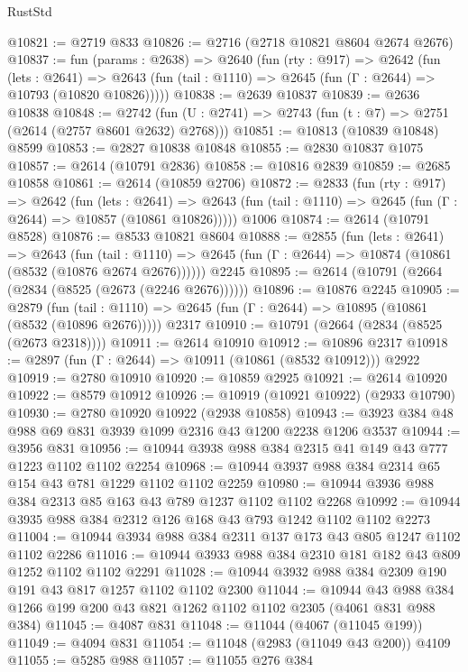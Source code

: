 \begin{lexlean}{RustStd}
\begin{coremodule}
@10821 := @2719 @833
@10826 := @2716 (@2718 @10821 @8604 @2674 @2676)
@10837 := fun (params : @2638) =>
  @2640
    (fun (rty : @917) =>
    @2642
      (fun (lets : @2641) =>
      @2643 (fun (tail : @1110) => @2645 (fun (Γ : @2644) => @10793 (@10820 @10826)))))
@10838 := @2639 @10837
@10839 := @2636 @10838
@10848 := @2742 (fun (U : @2741) => @2743 (fun (t : @7) => @2751 (@2614 (@2757 @8601 @2632) @2768)))
@10851 := @10813 (@10839 @10848) @8599
@10853 := @2827 @10838 @10848
@10855 := @2830 @10837 @1075
@10857 := @2614 (@10791 @2836)
@10858 := @10816 @2839
@10859 := @2685 @10858
@10861 := @2614 (@10859 @2706)
@10872 := @2833
    (fun (rty : @917) =>
    @2642
      (fun (lets : @2641) =>
      @2643 (fun (tail : @1110) => @2645 (fun (Γ : @2644) => @10857 (@10861 @10826)))))
    @1006
@10874 := @2614 (@10791 @8528)
@10876 := @8533 @10821 @8604
@10888 := @2855
    (fun (lets : @2641) =>
    @2643
      (fun (tail : @1110) =>
      @2645 (fun (Γ : @2644) => @10874 (@10861 (@8532 (@10876 @2674 @2676))))))
    @2245
@10895 := @2614 (@10791 (@2664 (@2834 (@8525 (@2673 (@2246 @2676))))))
@10896 := @10876 @2245
@10905 := @2879
    (fun (tail : @1110) => @2645 (fun (Γ : @2644) => @10895 (@10861 (@8532 (@10896 @2676)))))
    @2317
@10910 := @10791 (@2664 (@2834 (@8525 (@2673 @2318))))
@10911 := @2614 @10910
@10912 := @10896 @2317
@10918 := @2897 (fun (Γ : @2644) => @10911 (@10861 (@8532 @10912))) @2922
@10919 := @2780 @10910
@10920 := @10859 @2925
@10921 := @2614 @10920
@10922 := @8579 @10912
@10926 := @10919 (@10921 @10922) (@2933 @10790)
@10930 := @2780 @10920 @10922 (@2938 @10858)
@10943 := @3923 @384 @48 @988 @69 @831 @3939 @1099 @2316 @43 @1200 @2238 @1206 @3537
@10944 := @3956 @831
@10956 := @10944 @3938 @988 @384 @2315 @41 @149 @43 @777 @1223 @1102 @1102 @2254
@10968 := @10944 @3937 @988 @384 @2314 @65 @154 @43 @781 @1229 @1102 @1102 @2259
@10980 := @10944 @3936 @988 @384 @2313 @85 @163 @43 @789 @1237 @1102 @1102 @2268
@10992 := @10944 @3935 @988 @384 @2312 @126 @168 @43 @793 @1242 @1102 @1102 @2273
@11004 := @10944 @3934 @988 @384 @2311 @137 @173 @43 @805 @1247 @1102 @1102 @2286
@11016 := @10944 @3933 @988 @384 @2310 @181 @182 @43 @809 @1252 @1102 @1102 @2291
@11028 := @10944 @3932 @988 @384 @2309 @190 @191 @43 @817 @1257 @1102 @1102 @2300
@11044 := @10944
    @43
    @988
    @384
    @1266
    @199
    @200
    @43
    @821
    @1262
    @1102
    @1102
    @2305
    (@4061 @831 @988 @384)
@11045 := @4087 @831
@11048 := @11044 (@4067 (@11045 @199))
@11049 := @4094 @831
@11054 := @11048 (@2983 (@11049 @43 @200)) @4109
@11055 := @5285 @988
@11057 := @11055 @276 @384

\end{coremodule}
\end{lexlean}
